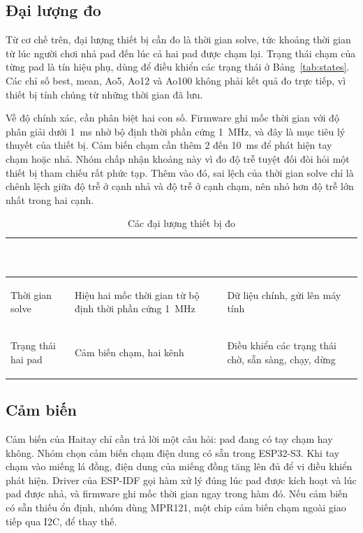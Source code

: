 \subsection{Đại lượng đo}
Từ cơ chế trên, đại lượng thiết bị cần đo là thời gian solve, tức khoảng thời gian từ lúc người chơi nhả pad đến lúc cả hai pad được chạm lại. Trạng thái chạm của từng pad là tín hiệu phụ, dùng để điều khiển các trạng thái ở Bảng~\ref{tab:states}. Các chỉ số best, mean, Ao5, Ao12 và Ao100 không phải kết quả đo trực tiếp, vì thiết bị tính chúng từ những thời gian đã lưu.

Về độ chính xác, cần phân biệt hai con số. Firmware ghi mốc thời gian với độ phân giải dưới 1~ms nhờ bộ định thời phần cứng 1~MHz, và đây là mục tiêu lý thuyết của thiết bị. Cảm biến chạm cần thêm 2 đến 10~ms để phát hiện tay chạm hoặc nhả. Nhóm chấp nhận khoảng này vì đo độ trễ tuyệt đối đòi hỏi một thiết bị tham chiếu rất phức tạp. Thêm vào đó, sai lệch của thời gian solve chỉ là chênh lệch giữa độ trễ ở cạnh nhả và độ trễ ở cạnh chạm, nên nhỏ hơn độ trễ lớn nhất trong hai cạnh.

\begin{table}[H]
    \centering
    \renewcommand{\arraystretch}{1.5}
    \caption{Các đại lượng thiết bị đo}
    \label{tab:measured}
    \begin{tabular}{>{\bfseries\raggedright\arraybackslash}m{3.4cm} >{\raggedright\arraybackslash}m{5.6cm} >{\raggedright\arraybackslash}m{5.2cm}}
        \toprule
        \rowcolor{haitayblue}
        \textcolor{white}{Đại lượng} & \textcolor{white}{Nguồn đo} & \textcolor{white}{Công dụng} \\
        \midrule
        \rowcolor{haitayblue!8}
        Thời gian solve & Hiệu hai mốc thời gian từ bộ định thời phần cứng 1~MHz & Dữ liệu chính, gửi lên máy tính \\
        Trạng thái hai pad & Cảm biến chạm, hai kênh & Điều khiển các trạng thái chờ, sẵn sàng, chạy, dừng \\
        \bottomrule
    \end{tabular}
\end{table}

\subsection{Cảm biến}
Cảm biến của Haitay chỉ cần trả lời một câu hỏi: pad đang có tay chạm hay không. Nhóm chọn cảm biến chạm điện dung có sẵn trong ESP32-S3. Khi tay chạm vào miếng lá đồng, điện dung của miếng đồng tăng lên đủ để vi điều khiển phát hiện. Driver của ESP-IDF gọi hàm xử lý đúng lúc pad được kích hoạt và lúc pad được nhả, và firmware ghi mốc thời gian ngay trong hàm đó. Nếu cảm biến có sẵn thiếu ổn định, nhóm dùng MPR121, một chip cảm biến chạm ngoài giao tiếp qua I2C, để thay thế.

